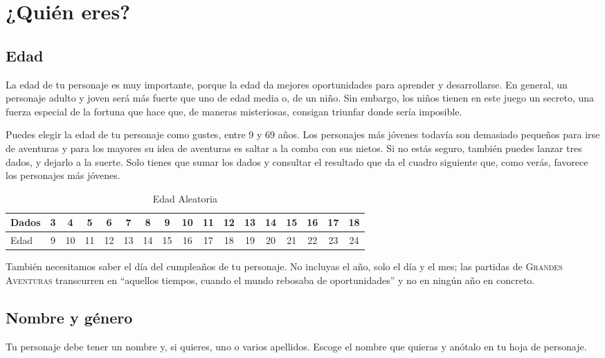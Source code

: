
\section{¿Quién eres?}

\subsection{Edad}

La edad de tu personaje es muy importante, porque la edad da mejores oportunidades para aprender y desarrollarse. En general, un personaje adulto y joven será más fuerte que uno de edad media o, de un niño. Sin embargo, los niños tienen en este juego un secreto, una fuerza especial de la fortuna que hace que, de maneras misteriosas, consigan triunfar donde sería imposible. 

Puedes elegir la edad de tu personaje como gustes, entre 9 y 69 años. Los personajes más jóvenes todavía son demasiado pequeños para irse de aventuras y para los mayores su idea de aventuras es saltar a la comba con sus nietos. Si no estás seguro, también puedes lanzar tres dados, y dejarlo a la suerte. Solo tienes que sumar los dados y consultar el resultado que da el cuadro siguiente que, como verás, favorece los personajes más jóvenes.

\begin{table}[h]
\footnotesize
\begin{tabular}{lcccccccccccccccc}
\toprule
Dados&3&4&5&6&7&8&9&10&11&12&13&14&15&16&17&18\\\midrule
Edad&9&10&11&12&13&14&15&16&17&18&19&20&21&22&23&24\\\midrule
\bottomrule
\end{tabular}
\caption{Edad Aleatoria}
\end{table}

También necesitamos saber el día del cumpleaños de tu personaje. No incluyas el año, solo el día y el mes; las partidas de \textsc{Grandes Aventuras} transcurren en \enquote{aquellos tiempos, cuando el mundo rebosaba de oportunidades} y no en ningún año en concreto.

\subsection{Nombre y género}

Tu personaje debe tener un nombre y, si quieres, uno o varios apellidos. Escoge el nombre que quieras y anótalo en tu hoja de personaje. 

